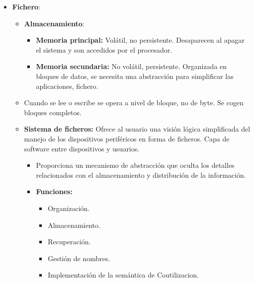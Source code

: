 \documentclass[12pt, twoside, openright]{report} %
\begin{document}
  \begin{itemize}
  \item \textbf{Fichero}:
    

    \begin{itemize}
    \item \textbf{Almacenamiento}:
      

      \begin{itemize}
      \item \textbf{Memoria principal:} Volátil, no persistente. Desaparecen
        al apagar el sistema y son accedidos por el procesador.
        
      \item \textbf{Memoria secundaria:} No volátil, persistente. Organizada
        en bloques de datos, se necesita una abstracción para
        simplificar las aplicaciones, fichero.
        
      \end{itemize}
    \item Cuando se lee o escribe se opera a nivel de bloque, no de byte. Se
      cogen bloques completos.
      
    \item \textbf{Sistema de ficheros:} Ofrece al usuario una visión lógica
      simplificada del manejo de los dispositivos periféricos en forma
      de ficheros. Capa de software entre dispositivos y usuarios.
      

      \begin{itemize}
      \item Proporciona un mecanismo de abstracción que oculta los detalles
        relacionados con el almacenamiento y distribución de la
        información.
        
      \item \textbf{Funciones:}
        

        \begin{itemize}
        \item Organización.
          
        \item Almacenamiento.
          
        \item Recuperación.
          
        \item Gestión de nombres.
          
        \item Implementación de la semántica de Coutilizacion.
          

\end{itemize}
\end{itemize}
\end{itemize}
\end{itemize}
\end{document}

